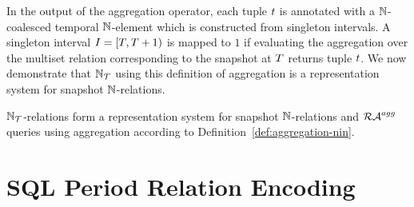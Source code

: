 In the output of the aggregation operator, each tuple $t$ is annotated with a ${\mathbb{N}}$-coalesced temporal ${\mathbb{N}}$-element which is constructed from singleton intervals. A singleton interval $I= [T,T+1)$ is mapped to $1$ if evaluating the aggregation over the multiset relation corresponding to the snapshot at $T$ returns tuple $t$. We now demonstrate that ${{\mathbb{N}}}_{\mathcal{T}}$
using this definition of aggregation
is a representation system for snapshot ${\mathbb{N}}$-relations. %

\begin{theo}\label{theo:our-agg-eq-their-agg}
  ${{\mathbb{N}}}_{\mathcal{T}}$-relations
form a representation system for snapshot ${\mathbb{N}}$-relations and $\mathcal{RA}^{agg}$ queries using aggregation according to Definition~\ref{def:aggregation-nin}.
\end{theo}



\section{SQL Period Relation Encoding} %
\label{sec:bag-semant-repr}

